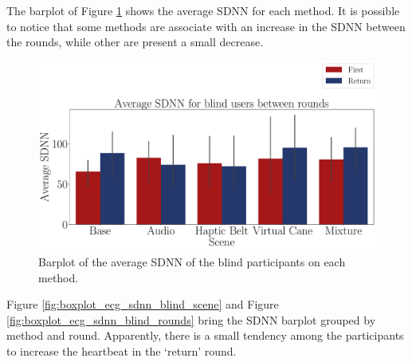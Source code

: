 

The barplot of Figure \ref{fig:barplot_ecg_sdnn_5_scene_blind}  shows the average SDNN for each method. It is possible to notice that some methods are associate with an increase in the SDNN between the rounds, while other are present a small decrease.

\begin{figure}[!htb]
    \centering
    \includegraphics[width = 0.8\linewidth]{Resultados/ECG/Figuras/pdf/barplot_ecg_sdnn_5_scene_blind.pdf}
    \caption{Barplot of the average SDNN of the blind participants on each method.}
    \label{fig:barplot_ecg_sdnn_5_scene_blind}
\end{figure}

%
%

Figure \ref{fig:boxplot_ecg_sdnn_blind_scene} and Figure \ref{fig:boxplot_ecg_sdnn_blind_rounds} bring the SDNN barplot grouped by method and round. Apparently, there is a small tendency among the participants to increase the heartbeat in the ‘return’ round.

